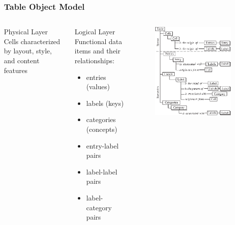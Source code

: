 \documentclass{beamer}
\begin{document}
\begin{frame}
\frametitle{Table Object Model}

\begin{columns}[c] %


\begin{block}{\small Physical Layer}
\small Cells characterized by layout, style, and content features
\end{block}
\begin{block}{\small Logical Layer}
\small Functional data items and their relationships:
\begin{itemize}
	\item \small entries (values)
	\item \small labels (keys)
	\item \small categories (concepts)
	\item \small entry-label pairs
	\item \small label-label pairs
	\item \small label-category pairs
\end{itemize}
\end{block}

\begin{figure}
\includegraphics[width=0.85\linewidth]{tom}
\end{figure}

\end{columns}

\end{frame}
\end{document}
